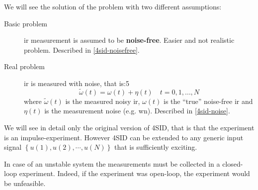 We will see the solution of the problem with two different assumptions:
\begin{description}
    \item [Basic problem] \gls{ir} measurement is assumed to be \textbf{noise-free}. Easier and not realistic problem. Described in \ref{4sid-noisefree}.
    \item [Real problem] \gls{ir} is measured with noise, that is:5
    \[ \widetilde{\omega}(t) = \omega(t) + \eta(t) \quad t = 0, 1,\dots, N \] where
        $\widetilde{\omega}(t)$ is the measured noisy \gls{ir},
        $\omega(t)$ is the ``true'' noise-free \gls{ir} and
        $\eta(t)$ is the measurement noise (e.g. \gls{wn}). Described in \ref{4sid-noise}.
\end{description}

\begin{remark}
    We will see in detail only the original version of 4SID, that is that the experiment is an impulse-experiment.
    However 4SID can be extended to any generic input signal $\left\{ u(1), u(2), \cdots, u(N) \right\}$ that is sufficiently exciting.
\end{remark}

\begin{remark}
    In case of an unstable system the measurements must be collected in a closed-loop experiment.
    Indeed, if the experiment was open-loop, the experiment would be unfeasible.

    \begin{figure}[H]
        \centering
    \end{figure}
\end{remark}

